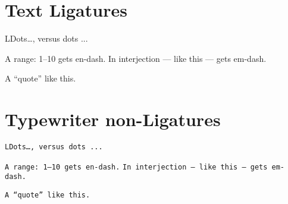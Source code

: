 \documentclass{article}
\begin{document}
\section{Text Ligatures}
LDots\ldots, versus dots ...

A range: 1--10 gets en-dash.
In interjection --- like this --- gets em-dash.

A ``quote'' like this.
\section{Typewriter non-Ligatures}
\texttt{LDots\ldots, versus dots ...}

\texttt{A range: 1--10 gets en-dash.}
\texttt{In interjection --- like this --- gets em-dash.}

\texttt{A ``quote'' like this.}
\end{document}
